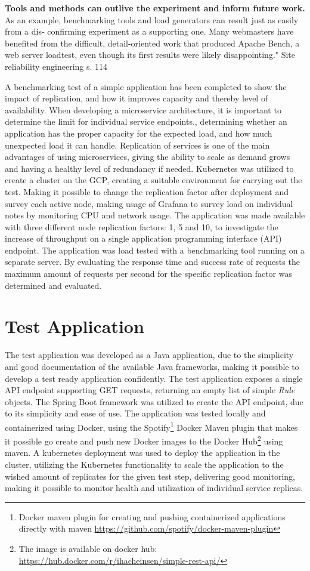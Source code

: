 \textbf{Tools and methods can outlive the experiment and inform future work.} As an example, benchmarking tools and load generators can result just as easily from a dis‐ confirming experiment as a supporting one. Many webmasters have benefited from the difficult, detail-oriented work that produced Apache Bench, a web server loadtest, even though its first results were likely disappointing."
Site reliability engineering s. 114


A benchmarking test of a simple application has been completed to show the impact of replication, and how it improves capacity and thereby level of availability. When developing a microservice architecture, it is important to determine the limit for individual service endpoints., determining whether an application has the proper capacity for the expected load, and how much unexpected load it can handle. Replication of services is one of the main advantages of using microservices, giving the ability to scale as demand grows and having a healthy level of redundancy if needed. 
Kubernetes was utilized to create a cluster on the GCP, creating a suitable environment for carrying out the test. Making it possible to change the replication factor after deployment and survey each active node, making usage of Grafana to survey load on individual notes by monitoring CPU and network usage. The application was made available with three different node replication factors: 1,  5 and 10, to investigate the increase of throughput on a single application programming interface (API) endpoint. 
The application was load tested with a benchmarking tool running on a separate server. By evaluating the response time and success rate of requests the maximum amount of requests per second for the specific replication factor was determined and evaluated.


\section{Test Application}
The test application was developed as a Java application, due to the simplicity and good documentation of the available Java frameworks, making it possible to develop a test ready application confidently. The test application exposes a single API endpoint supporting GET requests, returning an empty list of simple \textit{Rule} objects. The Spring Boot framework was utilized to create the API endpoint, due to its simplicity and ease of use. The application was tested locally and containerized using Docker, using the Spotify\footnote{Docker maven plugin for creating and pushing containerized applications directly with maven \url{https://github.com/spotify/docker-maven-plugin}} Docker Maven plugin that makes it possible go create and push new Docker images to the Docker Hub\footnote{The image is available on docker hub: \url{https://hub.docker.com/r/ihacheinsen/simple-rest-api/}} using maven. A kubernetes deployment was  used to deploy the application in the cluster, utilizing the Kubernetes functionality to scale the application to the wished amount of replicates for the given test step, delivering good monitoring, making it possible to monitor health and utilization of individual service replicas.

